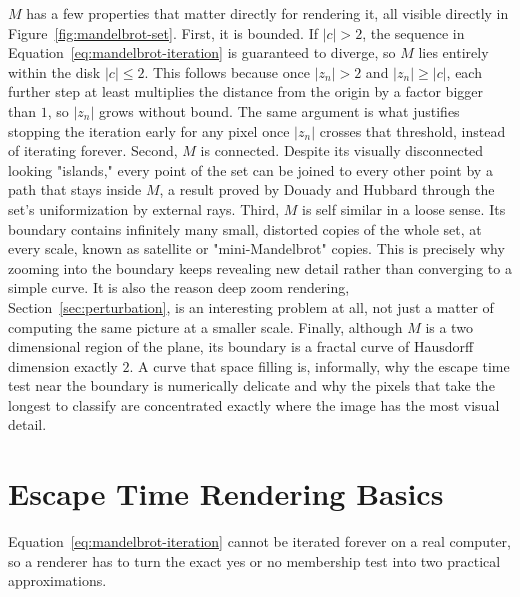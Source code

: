 \documentclass{ftndiplomski}
\begin{document}
$M$ has a few properties that matter directly for rendering it, all visible directly in
Figure~\ref{fig:mandelbrot-set}. First, it is bounded. If $|c| > 2$, the sequence in
Equation~\ref{eq:mandelbrot-iteration} is guaranteed to diverge, so $M$ lies entirely within the
disk $|c| \leq 2$. This follows because once $|z_n| > 2$ and $|z_n| \geq |c|$, each further step at
least multiplies the distance from the origin by a factor bigger than $1$, so $|z_n|$ grows without
bound. The same argument is what justifies stopping the iteration early for any pixel once $|z_n|$
crosses that threshold, instead of iterating forever. Second, $M$ is connected. Despite its visually
disconnected looking "islands," every point of the set can be joined to every other point by a
path that stays inside $M$, a result proved by Douady and Hubbard through the set's uniformization
by external rays. Third, $M$ is self similar in a loose sense. Its boundary contains infinitely many
small, distorted copies of the whole set, at every scale, known as satellite or "mini-Mandelbrot"
copies. This is precisely why zooming into the boundary keeps revealing new detail rather than
converging to a simple curve. It is also the reason deep zoom rendering, Section~\ref{sec:perturbation},
is an interesting problem at all, not just a matter of computing the same picture at a smaller
scale. Finally, although $M$ is a two dimensional region of the plane, its boundary is a fractal
curve of Hausdorff dimension exactly $2$. A curve that space filling is,
informally, why the escape time test near the boundary is numerically delicate and why the pixels
that take the longest to classify are concentrated exactly where the image has the most visual
detail.

\section{Escape Time Rendering Basics}
\label{sec:escape-time-basics}

Equation~\ref{eq:mandelbrot-iteration} cannot be iterated forever on a real computer, so a
renderer has to turn the exact yes or no membership test into two practical approximations.
\end{document}
